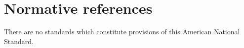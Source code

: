 \hypertarget{normative-references}{%
\chapter{Normative references}\label{normative-references}}

There are no standards which constitute provisions of this American
National Standard.
